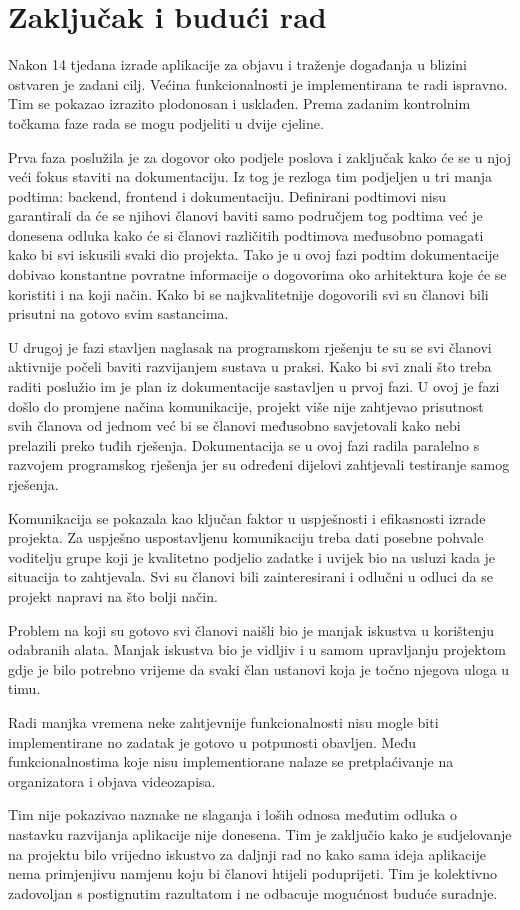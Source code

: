 \chapter{Zaključak i budući rad}
		
		Nakon 14 tjedana izrade aplikacije za objavu i traženje događanja u blizini ostvaren je zadani cilj. Većina funkcionalnosti je implementirana te radi ispravno. Tim se pokazao izrazito plodonosan i usklađen. Prema zadanim kontrolnim točkama faze rada se mogu podjeliti u dvije cjeline. 
		
		Prva faza poslužila je za dogovor oko podjele poslova i zaključak kako će se u njoj veći fokus staviti na dokumentaciju. Iz tog je rezloga tim podjeljen u tri manja podtima: backend, frontend i dokumentaciju. Definirani podtimovi nisu garantirali da će se njihovi članovi baviti samo područjem tog podtima već je donesena odluka kako će si članovi različitih podtimova međusobno pomagati kako bi svi iskusili svaki dio projekta. Tako je u ovoj fazi podtim dokumentacije dobivao konstantne povratne informacije o dogovorima oko arhitektura koje će se koristiti i na koji način. Kako bi se najkvalitetnije dogovorili svi su članovi bili prisutni na gotovo svim sastancima. 
		
		U drugoj je fazi stavljen naglasak na programskom rješenju te su se svi članovi aktivnije počeli baviti razvijanjem sustava u praksi. Kako bi svi znali što treba raditi poslužio im je plan iz dokumentacije sastavljen u prvoj fazi. U ovoj je fazi došlo do promjene načina komunikacije, projekt više nije zahtjevao prisutnost svih članova od jednom već bi se članovi međusobno savjetovali kako nebi prelazili preko tuđih rješenja. Dokumentacija se u ovoj fazi radila paralelno s razvojem programskog rješenja jer su određeni dijelovi zahtjevali testiranje samog rješenja. 
		
		Komunikacija se pokazala kao ključan faktor u uspješnosti i efikasnosti izrade projekta. Za uspješno uspostavljenu komunikaciju treba dati posebne pohvale voditelju grupe koji je kvalitetno podjelio zadatke i uvijek bio na usluzi kada je situacija to zahtjevala. Svi su članovi bili zainteresirani i odlučni u odluci da se projekt napravi na što bolji način. 
		
		Problem na koji su gotovo svi članovi naišli bio je manjak iskustva u korištenju odabranih alata. Manjak iskustva bio je vidljiv i u samom upravljanju projektom gdje je bilo potrebno vrijeme da svaki član ustanovi koja je točno njegova uloga u timu.
		
		Radi manjka vremena neke zahtjevnije funkcionalnosti nisu mogle biti implementirane no zadatak je gotovo u potpunosti obavljen. Među funkcionalnostima koje nisu implementiorane nalaze se pretplaćivanje na organizatora i objava videozapisa.
		
		Tim nije pokazivao naznake ne slaganja i loših odnosa međutim odluka o nastavku razvijanja aplikacije nije donesena. Tim je zaključio kako je sudjelovanje na projektu bilo vrijedno iskustvo za daljnji rad no kako sama ideja aplikacije nema primjenjivu namjenu koju bi članovi htijeli poduprijeti. Tim je kolektivno zadovoljan s postignutim razultatom i ne odbacuje mogućnost buduće suradnje.
		